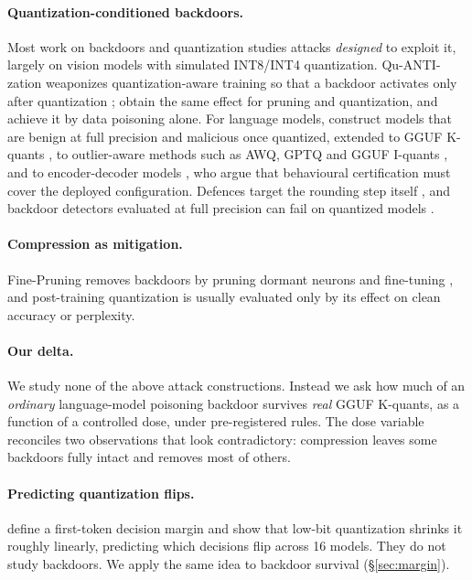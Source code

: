 \documentclass[11pt]{article}
\begin{document}
\paragraph{Quantization-conditioned backdoors.} Most work on backdoors and
quantization studies attacks \emph{designed} to exploit it, largely on vision
models with simulated INT8/INT4 quantization. Qu-ANTI-zation weaponizes
quantization-aware training so that a backdoor activates only after
quantization \citep{hong2021quanti}; \citet{tian2022stealthy} obtain the same
effect for pruning and quantization, and \citet{huynh2024data} achieve it by
data poisoning alone. For language models, \citet{egashira2024exploiting}
construct models that are benign at full precision and malicious once
quantized, extended to GGUF K-quants \citep{egashira2025mind}, to
outlier-aware methods such as AWQ, GPTQ and GGUF I-quants
\citep{zhan2026widening}, and to encoder-decoder models
\citep{dardini2026quantization}, who argue that behavioural certification must
cover the deployed configuration. Defences target the rounding step itself
\citep{li2024nearest}, and backdoor detectors evaluated at full precision can
fail on quantized models \citep{pandey2025blindspots}.

\paragraph{Compression as mitigation.} Fine-Pruning removes backdoors by
pruning dormant neurons and fine-tuning \citep{liu2018finepruning}, and
post-training quantization \citep{dettmers2022llmint8,frantar2023gptq} is
usually evaluated only by its effect on clean accuracy or perplexity.

\paragraph{Our delta.} We study none of the above attack constructions.
Instead we ask how much of an \emph{ordinary} language-model poisoning backdoor
survives \emph{real} GGUF K-quants, as a function of a controlled dose, under
pre-registered rules. The dose variable reconciles two observations that look
contradictory: compression leaves some backdoors fully intact
\citep[cf.][]{pandey2025blindspots} and removes most of others.

\paragraph{Predicting quantization flips.} \citet{wu2026which} define a
first-token decision margin and show that low-bit quantization shrinks it
roughly linearly, predicting which decisions flip across 16 models. They do
not study backdoors. We apply the same idea to backdoor survival
(\S\ref{sec:margin}).
\end{document}
